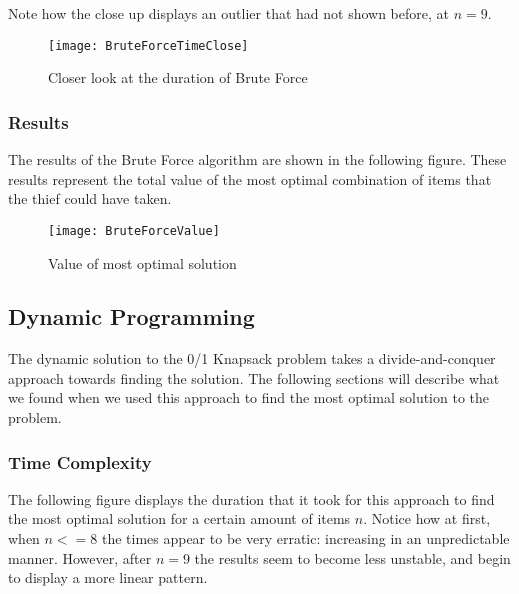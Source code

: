 \documentclass[12pt]{article}
\begin{document}
    Note how the close up displays an outlier that had not shown before, at $ n = 9$.
    
    \begin{figure}[H]
		\begin{center}    
    		\texttt{[image: BruteForceTimeClose]}
            \caption{Closer look at the duration of Brute Force}
    	\end{center}
    \end{figure}
    
   
    \subsubsection*{Results}
    
    The results of the Brute Force algorithm are shown in the following figure. These results represent the total value of the most optimal combination of items that the thief could have taken.
    
       	\begin{figure}[H]
		\begin{center}    
    		\texttt{[image: BruteForceValue]}
            \caption{Value of most optimal solution}
    	\end{center}
    \end{figure}
    
	
	\subsection*{Dynamic Programming}
	
    The dynamic solution to the 0/1 Knapsack problem takes a divide-and-conquer approach towards finding the solution. The following sections will describe what we found when we used this approach to find the most optimal solution to the problem.
    
    \subsubsection*{Time Complexity} 
    
    The following figure displays the duration that it took for this approach to find the most optimal solution for a certain amount of items $n$. Notice how at first, when $n <= 8$ the times appear to be very erratic: increasing in an unpredictable manner. However, after $n = 9 $ the results seem to become less unstable, and begin to display a more linear pattern.
    
\end{document}

